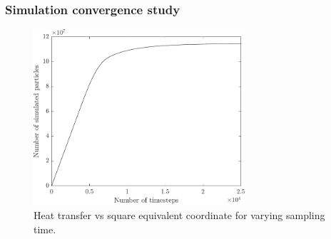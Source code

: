 \subsubsection{Simulation convergence study}

\begin{figure}
    \centering
    \includegraphics[width=0.7\textwidth]{Images/3. Methodology/Simulation convergence/simconv.pdf}
    \caption{Heat transfer vs square equivalent coordinate for varying sampling time.}
    \label{fig:simconv}
\end{figure}